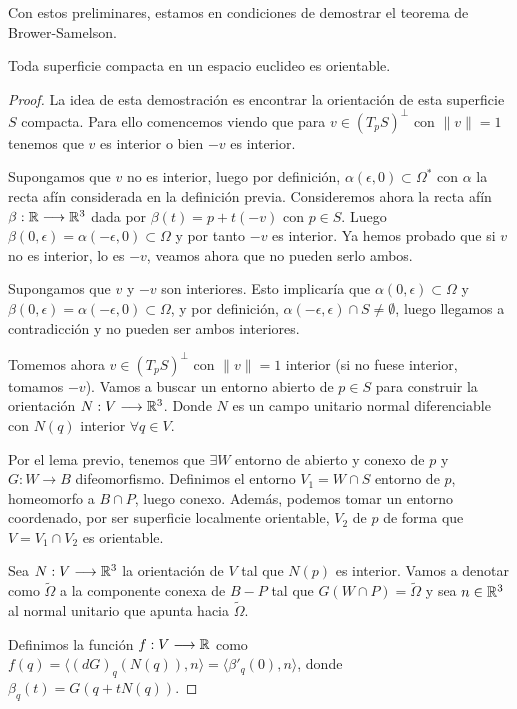 Con estos preliminares, estamos en condiciones de demostrar el teorema de Brower-Samelson.

\begin{theorem}\label{browersamelson}
Toda superficie compacta en un espacio euclideo es orientable.
\end{theorem}
\begin{proof}
La idea de esta demostración es encontrar la orientación de esta superficie $S$ compacta. Para ello comencemos viendo que para $v \in (T_pS)^{\bot}$ con $\lVert v \rVert=1$ tenemos que $v$ es interior o bien $-v$ es interior.

Supongamos que $v$ no es interior, luego por definición, $\alpha(\epsilon, 0) \subset \Omega^{*}$ con $\alpha$ la recta afín considerada en la definición previa. Consideremos ahora la recta afín $\beta: \mathbb{R} \longrightarrow \mathbb{R}^3$ dada por $\beta(t)=p + t(-v)$ con $p \in S$. Luego $\beta(0, \epsilon) = \alpha(-\epsilon, 0) \subset \Omega$ y por tanto $-v$ es interior. Ya hemos probado que si $v$ no es interior, lo es $-v$, veamos ahora que no pueden serlo ambos.

Supongamos que $v$ y $-v$ son interiores. Esto implicaría que $\alpha(0,\epsilon) \subset \Omega$ y $\beta(0, \epsilon) = \alpha(-\epsilon, 0) \subset \Omega$, y por definición, $\alpha(-\epsilon, \epsilon) \cap S \neq \emptyset$, luego llegamos a contradicción y no pueden ser ambos interiores.

Tomemos ahora $v \in (T_pS)^{\bot}$ con $\lVert v \rVert=1$ interior (si no fuese interior, tomamos $-v$). Vamos a buscar un entorno abierto de $p \in S$ para construir la orientación $N: V \longrightarrow \mathbb{R}^3$. Donde $N$ es un campo unitario normal diferenciable con $N(q)$ interior $\forall q \in V.$

Por el lema previo, tenemos que $\exists W$ entorno de abierto y conexo de $p$ y $G: W \longrightarrow B$ difeomorfismo. Definimos el entorno $V_1=W\cap S$ entorno de $p$, homeomorfo a $B\cap P$, luego conexo. Además, podemos tomar un entorno coordenado, por ser superficie localmente orientable, $V_2$ de $p$ de forma que $V=V_1 \cap V_2$ es orientable.

Sea $N: V \longrightarrow \mathbb{R}^3$ la orientación de $V$ tal que $N(p)$ es interior. Vamos a denotar como $\tilde{\Omega}$ a la componente conexa de $B-P$ tal que $G(W\cap P) = \tilde{\Omega}$ y sea $n \in \mathbb{R}^3$ al normal unitario que apunta hacia $\tilde{\Omega}$.

Definimos la función $f: V \longrightarrow \mathbb{R}$ como $f(q) = \langle (dG)_q(N(q)), n \rangle = \langle \beta'_q(0), n \rangle$, donde $\beta_q(t) = G(q + tN(q))$.


\end{proof}
